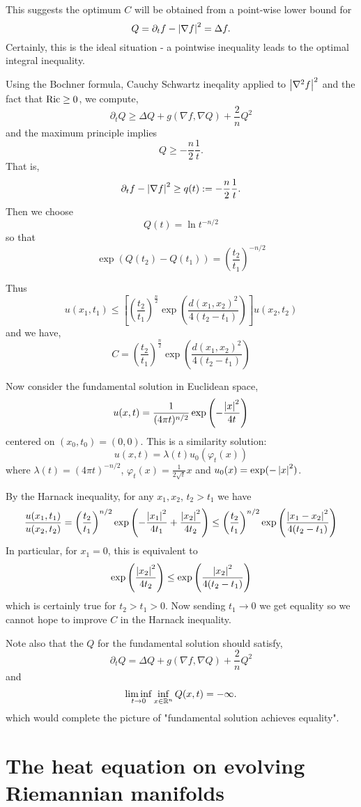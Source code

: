 \documentclass{amsart}
\begin{document}
This suggests the optimum $C$ will be obtained from a point-wise lower bound for
\[
Q = \partial_t f - \left|{\nabla f}\right|^2 = \Delta f.
\]
Certainly, this is the ideal situation - a pointwise inequality leads to the optimal integral inequality.

Using the Bochner formula, Cauchy Schwartz ineqality applied to $\left|{\nabla^2 f}\right|^2$ and the fact that \(\operatorname{Ric} \geq 0\), we compute,
\[
\partial_t Q \geq \Delta Q + g(\nabla f, \nabla Q) + \frac{2}{n} Q^2
\]
and the maximum principle implies
\[
Q \geq -\frac{n}{2} \frac{1}{t}.
\]
That is,
\[
\partial_t f - \left|{\nabla f}\right|^2 \geq q(t) := -\frac{n}{2} \frac{1}{t}.
\]
Then we choose
\[
Q(t) = \ln t^{-n/2}
\]
so that
\[
\exp(Q(t_2) - Q(t_1)) = \left(\frac{t_2}{t_1}\right)^{-n/2}
\]

Thus
\[
u(x_1, t_1) \leq \left[\left(\frac{t_2}{t_1}\right)^{\tfrac{n}{2}} \exp\left(\frac{d(x_1, x_2)^2}{4(t_2 - t_1)}\right)\right] u(x_2, t_2)
\]
and we have,
\[
C = \left(\frac{t_2}{t_1}\right)^{\tfrac{n}{2}} \exp\left(\frac{d(x_1, x_2)^2}{4(t_2 - t_1)}\right)
\]

Now consider the fundamental solution in Euclidean space,
\[
u(x, t) = \frac{1}{(4\pi t)^{n/2}} \exp\left(-\frac{\left|{x}\right|^2}{4t}\right)
\]
centered on $(x_0, t_0) = (0, 0)$. This is a similarity solution:
\[
u(x, t) = \lambda(t) u_0(\varphi_t(x))
\]
where $\lambda(t) = (4\pi t)^{-n/2}$, $\varphi_t(x) = \tfrac{1}{2\sqrt{t}} x$ and $u_0(x) = \exp(-\left|{x}\right|^2)$.

By the Harnack inequality, for any $x_1, x_2$, $t_2 > t_1$ we have
\[
\frac{u(x_1, t_1)}{u(x_2, t_2)} = \left(\frac{t_2}{t_1}\right)^{n/2} \exp\left(-\frac{\left|{x_1}\right|^2}{4t_1} + \frac{\left|{x_2}\right|^2}{4t_2}\right) \leq \left(\frac{t_2}{t_1}\right)^{n/2} \exp\left(\frac{\left|{x_1 - x_2}\right|^2}{4(t_2 - t_1)}\right)
\]
In particular, for $x_1 = 0$, this is equivalent to
\[
\exp\left(\frac{\left|{x_2}\right|^2}{4t_2}\right) \leq \exp\left(\frac{\left|{x_2}\right|^2}{4(t_2 - t_1)}\right)
\]
which is certainly true for $t_2 > t_1 > 0$. Now sending $t_1 \to 0$ we get equality so we cannot hope to improve $C$ in the Harnack inequality.

Note also that the $Q$ for the fundamental solution should satisfy,
\[
\partial_t Q = \Delta Q + g(\nabla f, \nabla Q) + \frac{2}{n} Q^2
\]
and
\[
\liminf_{t\to 0} \inf_{x \in \mathbb{R}^n} Q(x, t) = - \infty.
\]
which would complete the picture of "fundamental solution achieves equality".
\section{The heat equation on evolving Riemannian manifolds}
\end{document}
